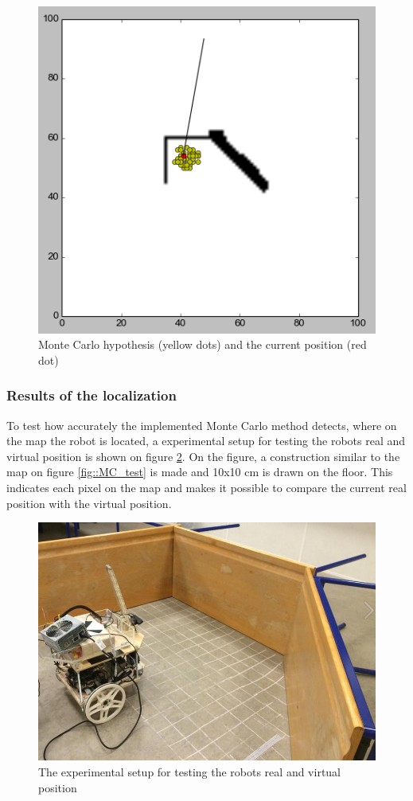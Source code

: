 \begin{figure}[H]
\centering
\includegraphics[scale=0.43]{img/MC.png}
\caption{Monte Carlo hypothesis (yellow dots) and the current position (red dot)}
\label{fig::MC}
\end{figure}

\newpage
\subsubsection{Results of the localization}
To test how accurately the implemented Monte Carlo method detects, where on the map the robot is located, a experimental setup for testing the robots real and virtual position is shown on figure \ref{fig::experimental}. On the figure, a construction similar to the map on figure \ref{fig::MC_test} is made and 10x10 cm is drawn on the floor. This indicates each pixel on the map and makes it possible to compare the current real position with the virtual position. 

\begin{figure}[H]
\centering 
\includegraphics[scale=0.3]{img/test.png}
\caption{The experimental setup for testing the robots real and virtual position}
\label{fig::experimental}
\end{figure}

